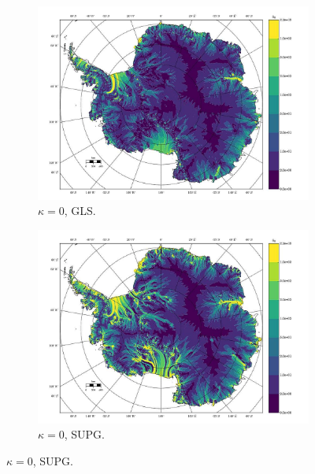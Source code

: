 \begin{figure}
  \label{antarctica_bv_image}
  
\end{figure}


\begin{figure}

  \centering

  \begin{subfigure}[b]{0.45\linewidth}
    \includegraphics[width=\linewidth]{images/balance_velocity/antarctica/d_U_ob_S/Ubar_10H_kappa_0_GLS.jpg}
  \caption{$\kappa = 0$, GLS.}
  \label{antarctica_bv_image_kappa_0_GLS_U_ob_S}
  \end{subfigure}
  \begin{subfigure}[b]{0.45\linewidth}
    \includegraphics[width=\linewidth]{images/balance_velocity/antarctica/d_U_ob_S/Ubar_10H_kappa_0_SUPG.jpg}
  \caption{$\kappa = 0$, SUPG.}
  \label{antarctica_bv_image_kappa_0_SUPG_U_ob_S}
  \end{subfigure}


\end{figure}
